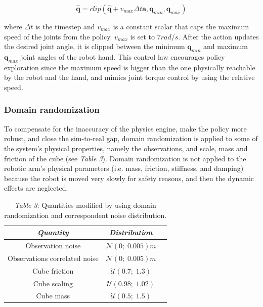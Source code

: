 \documentclass[a4paper]{article}
\begin{document}
\begin{equation}
    \hat{\textbf{q}} = clip(\hat{\textbf{q}}+v_{max} \Delta t \textbf{a}, \textbf{q}_{min}, \textbf{q}_{max})
    \label{control_law}
\end{equation}

where $\Delta t$ is the timestep and $v_{max}$ is a constant scalar that caps the maximum speed of the joints from the policy. $v_{max}$ is set to $7 rad/s$. After the action updates the desired joint angle, it is clipped between the minimum $\textbf{q}_{min}$ and maximum $\textbf{q}_{max}$ joint angles of the robot hand.
This control law encourages policy exploration since the maximum speed is bigger than the one physically reachable by the robot and the hand, and mimics joint torque control by using the relative speed.

\subsubsection{Domain randomization}

To compensate for the inaccuracy of the physics engine, make the policy more robust, and close the sim-to-real gap, domain randomization is applied to some of the system's physical properties, namely the observations, and scale, mass and friction of the cube (see \textit{Table 3}). Domain randomization is not applied to the robotic arm's physical parameters (i.e. mass, friction, stiffness, and damping) because the robot is moved very slowly for safety reasons, and then the dynamic effects are neglected.

\begin{table}[h]
    \centering
    \begin{tabular}{|c|c|c|}
    \hline \textit{\textbf{Quantity}} & \textit{\textbf{Distribution}} \\
    \hline Observation noise & $\mathcal{N}(0;\;0.005) m$\\
    \hline Observations correlated noise & $\mathcal{N}(0;\;0.005) m$\\
    \hline Cube friction & $\mathcal{U}(0.7;\;1.3)$\\
    \hline Cube scaling & $\mathcal{U}(0.98;\;1.02)$\\
    \hline Cube mass & $\mathcal{U}(0.5;\;1.5)$\\
    \hline
    \end{tabular}
    \caption*{\textit{Table 3}: Quantities modified by using domain randomization and correspondent noise distribution.}
\end{table}
    
\end{document}
